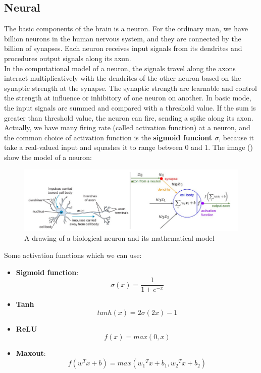 \subsection{Neural}
The basic components of the brain is a neuron. For the ordinary man, we have billion neurons in the human nervous system, and they are connected by the billion of synapses. Each neuron receives input signals from its dendrites and procedures output signals along its axon.\\[0.2cm]
In the computational model of a neuron, the signals travel along the axons interact multiplicatively with the dendrites of the other neuron based on the synaptic strength at the synapse. The synaptic strength are learnable and control the strength at influence or inhibitory of one neuron on another. In basic mode, the input signals are summed and compared with a threshold value. If the sum is greater than threshold value, the neuron can fire, sending a spike along its axon. Actually, we have many firing rate (called activation function) at a neuron, and the common choice of activation function is the \textbf{sigmoid funciont $\sigma$}, because it take a real-valued input and squashes it to range between 0 and 1. The image () show the model of a neuron:
\begin{figure}[h]
	\centering
	\includegraphics[scale=0.5]{images/neurons.png}
	\caption{A drawing of a biological neuron and its mathematical model}
	\label{fignneuron}
\end{figure}
Some activation functions which we can use:
\begin{itemize}
	\item \textbf{Sigmoid function}:
		\begin{equation}
			\sigma(x) = \frac{1}{1+e^{-x}}
		\end{equation}
	\item \textbf{Tanh}
		\begin{equation}
			tanh(x) = 2\sigma(2x) - 1
		\end{equation}
	\item \textbf{ReLU}
		\begin{equation}
			f(x) = max(0,x)
		\end{equation}
	\item \textbf{Maxout}:
		\begin{equation}
			f(w^Tx + b) = max({w_1}^Tx + b_1,{w_2}^Tx + b_2)
		\end{equation}
\end{itemize}
